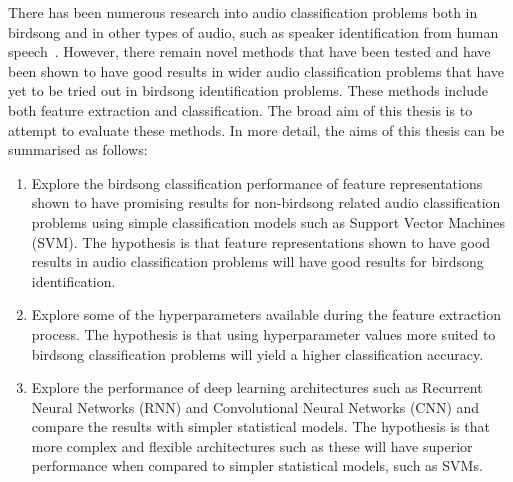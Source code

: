 There has been numerous research into audio classification problems both in
birdsong and in other types of audio, such as speaker identification from human
speech~\cite{KUDO19991103}. However, there remain novel methods that have been
tested and have been shown to have good results in wider audio classification
problems that have yet to be tried out in birdsong identification problems.
These methods include both feature extraction and classification. The
broad aim of this thesis is to attempt to evaluate these methods. In more
detail, the aims of this thesis can be summarised as follows:

\begin{enumerate}

  \item Explore the birdsong classification performance of feature
    representations shown to have promising results for non-birdsong related
    audio classification problems using simple classification models such as
    Support Vector Machines (SVM). The hypothesis is that feature
    representations shown to have good results in audio classification problems
    will have good results for birdsong identification.

  \item Explore some of the hyperparameters available during the feature
    extraction process. The hypothesis is that using hyperparameter values more
    suited to birdsong classification problems will yield a higher classification
    accuracy.

  \item Explore the performance of deep learning architectures such as Recurrent
    Neural Networks (RNN) and Convolutional Neural Networks (CNN) and compare
    the results with simpler statistical models. The hypothesis is that more
    complex and flexible architectures such as these will have superior
    performance when compared to simpler statistical models, such as SVMs.

\end{enumerate}
